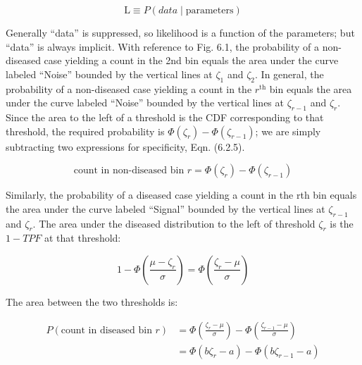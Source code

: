 \documentclass[
]{book}
\begin{document}
\begin{equation*} 
\text {L} \equiv P\left ( data \mid \text {parameters} \right )
\end{equation*}

Generally ``data'' is suppressed, so likelihood is a function of the parameters; but ``data'' is always implicit. With reference to Fig. 6.1, the probability of a non-diseased case yielding a count in the 2nd bin equals the area under the curve labeled ``Noise'' bounded by the vertical lines at \(\zeta_1\) and \(\zeta_2\). In general, the probability of a non-diseased case yielding a count in the \(r^\text{th}\) bin equals the area under the curve labeled ``Noise'' bounded by the vertical lines at \(\zeta_{r-1}\) and \(\zeta_r\). Since the area to the left of a threshold is the CDF corresponding to that threshold, the required probability is \(\Phi\left ( \zeta_r \right ) - \Phi\left ( \zeta_{r-1} \right )\); we are simply subtracting two expressions for specificity, Eqn. (6.2.5).

\begin{equation*} 
\text {count in non-diseased bin } r = \Phi\left ( \zeta_r \right ) - \Phi\left ( \zeta_{r-1} \right )
\end{equation*}

Similarly, the probability of a diseased case yielding a count in the rth bin equals the area under the curve labeled ``Signal'' bounded by the vertical lines at \(\zeta_{r-1}\) and \(\zeta_r\). The area under the diseased distribution to the left of threshold \(\zeta_r\) is the \(1 - TPF\) at that threshold:

\begin{equation*} 
1 - \Phi\left ( \frac{\mu-\zeta_r}{\sigma} \right ) = \Phi\left ( \frac{\zeta_r - \mu}{\sigma} \right )
\end{equation*}

The area between the two thresholds is:

\begin{align*} 
P\left ( \text{count in diseased bin }r \right ) &= \Phi\left ( \frac{\zeta_r - \mu}{\sigma} \right ) - \Phi\left ( \frac{\zeta_{r-1} - \mu}{\sigma} \right ) \\
&= \Phi\left ( b\zeta_r-a \right ) - \Phi\left ( b\zeta_{r-1}-a \right )
\end{align*}
\end{document}
